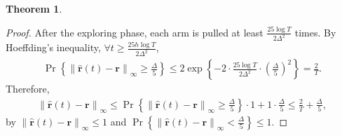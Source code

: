 \documentclass[10pt]{article}
\def\rvr{{\mathbf{r}}}
\newtheorem{thm}{Theorem}
\DeclareMathOperator*{\probability}{Pr}
\begin{document}
\begin{thm}

\end{thm}
\begin{proof}
    After the exploring phase, each arm is pulled at least $\frac{25 \log{T}}{2 \Delta^2}$ times. By Hoeffding's inequality, $\forall t \ge \frac{25 h \log{T}}{2 \Delta^2}$,
\begin{equation*}
\begin{split}
    \probability{\left\{ \left\| \hat{\rvr}\left(t\right) - \rvr \right\|_\infty \ge  \frac{\Delta}{5} \right\} } \le 2 \exp\left\{ - 2 \cdot \frac{25 \log{T}}{2 \Delta^2} \cdot  \left( \frac{\Delta}{5} \right)^2 \right\} = \frac{2}{T}.
\end{split}
\end{equation*}
Therefore,
\begin{equation*}
\begin{split}
    \left\| \hat{\rvr}\left(t\right) - \rvr \right\|_\infty \le \probability{\left\{ \left\| \hat{\rvr}\left(t\right) - \rvr \right\|_\infty \ge  \frac{\Delta}{5} \right\} } \cdot 1 + 1 \cdot \frac{\Delta}{5} \le \frac{2}{T} + \frac{\Delta}{5},
\end{split}
\end{equation*}
by $\left\| \hat{\rvr}\left(t\right) - \rvr \right\|_\infty \le 1$ and $\probability{\left\{ \left\| \hat{\rvr}\left(t\right) - \rvr \right\|_\infty <  \frac{\Delta}{5} \right\} } \le 1$.
\end{proof}
\end{document}

